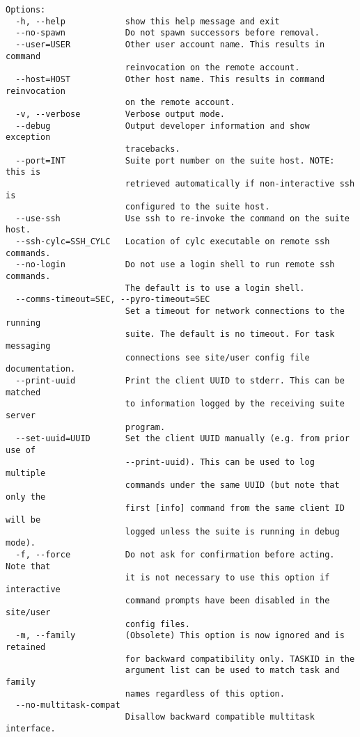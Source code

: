 \begin{lstlisting}
Options:
  -h, --help            show this help message and exit
  --no-spawn            Do not spawn successors before removal.
  --user=USER           Other user account name. This results in command
                        reinvocation on the remote account.
  --host=HOST           Other host name. This results in command reinvocation
                        on the remote account.
  -v, --verbose         Verbose output mode.
  --debug               Output developer information and show exception
                        tracebacks.
  --port=INT            Suite port number on the suite host. NOTE: this is
                        retrieved automatically if non-interactive ssh is
                        configured to the suite host.
  --use-ssh             Use ssh to re-invoke the command on the suite host.
  --ssh-cylc=SSH_CYLC   Location of cylc executable on remote ssh commands.
  --no-login            Do not use a login shell to run remote ssh commands.
                        The default is to use a login shell.
  --comms-timeout=SEC, --pyro-timeout=SEC
                        Set a timeout for network connections to the running
                        suite. The default is no timeout. For task messaging
                        connections see site/user config file documentation.
  --print-uuid          Print the client UUID to stderr. This can be matched
                        to information logged by the receiving suite server
                        program.
  --set-uuid=UUID       Set the client UUID manually (e.g. from prior use of
                        --print-uuid). This can be used to log multiple
                        commands under the same UUID (but note that only the
                        first [info] command from the same client ID will be
                        logged unless the suite is running in debug mode).
  -f, --force           Do not ask for confirmation before acting. Note that
                        it is not necessary to use this option if interactive
                        command prompts have been disabled in the site/user
                        config files.
  -m, --family          (Obsolete) This option is now ignored and is retained
                        for backward compatibility only. TASKID in the
                        argument list can be used to match task and family
                        names regardless of this option.
  --no-multitask-compat
                        Disallow backward compatible multitask interface.
\end{lstlisting}
